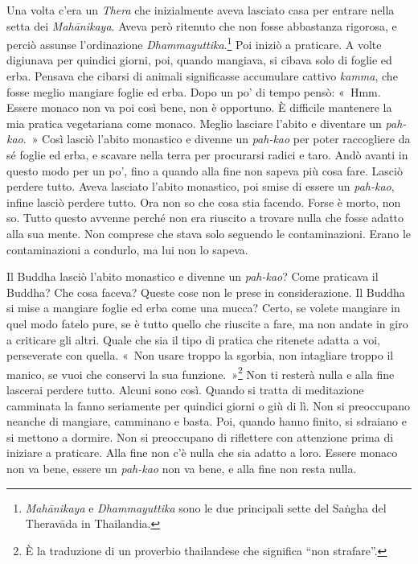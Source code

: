 Una volta c'era un \emph{Thera} che inizialmente aveva lasciato casa per
entrare nella setta dei \emph{Mahānikaya}. Aveva però ritenuto che non
fosse abbastanza rigorosa, e perciò assunse l'ordinazione
\emph{Dhammayuttika}.\footnote{\emph{Mahānikaya} e
  \emph{Dhammayuttika} sono le due principali sette del Saṅgha del
  Theravāda in Thailandia.} Poi iniziò a praticare. A volte digiunava
per quindici giorni, poi, quando mangiava, si cibava solo di foglie ed
erba. Pensava che cibarsi di animali significasse accumulare cattivo
\emph{kamma}, che fosse meglio mangiare foglie ed erba. Dopo un po' di
tempo pensò: «~Hmm. Essere monaco non va poi così bene, non è opportuno.
È difficile mantenere la mia pratica vegetariana come monaco. Meglio
lasciare l'abito e diventare un \emph{pah-kao}.~» Così lasciò l'abito
monastico e divenne un \emph{pah-kao} per poter raccogliere da sé foglie
ed erba, e scavare nella terra per procurarsi radici e taro. Andò avanti
in questo modo per un po', fino a quando alla fine non sapeva più cosa
fare. Lasciò perdere tutto. Aveva lasciato l'abito monastico, poi smise
di essere un \emph{pah-kao}, infine lasciò perdere tutto. Ora non so che
cosa stia facendo. Forse è morto, non so. Tutto questo avvenne perché
non era riuscito a trovare nulla che fosse adatto alla sua mente. Non
comprese che stava solo seguendo le contaminazioni. Erano le
contaminazioni a condurlo, ma lui non lo sapeva.

Il Buddha lasciò l'abito monastico e divenne un \emph{pah-kao}? Come
praticava il Buddha? Che cosa faceva? Queste cose non le prese in
considerazione. Il Buddha si mise a mangiare foglie ed erba come una
mucca? Certo, se volete mangiare in quel modo fatelo pure, se è tutto
quello che riuscite a fare, ma non andate in giro a criticare gli altri.
Quale che sia il tipo di pratica che ritenete adatta a voi, perseverate
con quella. «~Non usare troppo la sgorbia, non intagliare troppo il
manico, se vuoi che conservi la sua funzione.~»\footnote{È la traduzione
  di un proverbio thailandese che significa ``non strafare''.} Non ti
resterà nulla e alla fine lascerai perdere tutto. Alcuni sono così.
Quando si tratta di meditazione camminata la fanno seriamente per
quindici giorni o giù di lì. Non si preoccupano neanche di mangiare,
camminano e basta. Poi, quando hanno finito, si sdraiano e si mettono a
dormire. Non si preoccupano di riflettere con attenzione prima di
iniziare a praticare. Alla fine non c'è nulla che sia adatto a loro.
Essere monaco non va bene, essere un \emph{pah-kao} non va bene, e alla
fine non resta nulla.

